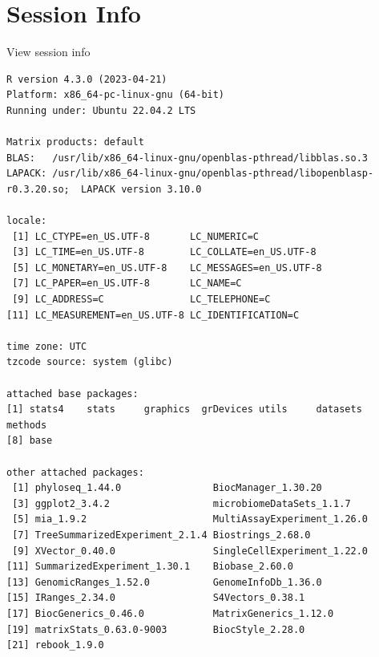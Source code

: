 \documentclass[
]{book}
\begin{document}
\hypertarget{session-info-1}{%
\section*{Session Info}\label{session-info-1}}

View session info

\begin{verbatim}
R version 4.3.0 (2023-04-21)
Platform: x86_64-pc-linux-gnu (64-bit)
Running under: Ubuntu 22.04.2 LTS

Matrix products: default
BLAS:   /usr/lib/x86_64-linux-gnu/openblas-pthread/libblas.so.3 
LAPACK: /usr/lib/x86_64-linux-gnu/openblas-pthread/libopenblasp-r0.3.20.so;  LAPACK version 3.10.0

locale:
 [1] LC_CTYPE=en_US.UTF-8       LC_NUMERIC=C              
 [3] LC_TIME=en_US.UTF-8        LC_COLLATE=en_US.UTF-8    
 [5] LC_MONETARY=en_US.UTF-8    LC_MESSAGES=en_US.UTF-8   
 [7] LC_PAPER=en_US.UTF-8       LC_NAME=C                 
 [9] LC_ADDRESS=C               LC_TELEPHONE=C            
[11] LC_MEASUREMENT=en_US.UTF-8 LC_IDENTIFICATION=C       

time zone: UTC
tzcode source: system (glibc)

attached base packages:
[1] stats4    stats     graphics  grDevices utils     datasets  methods  
[8] base     

other attached packages:
 [1] phyloseq_1.44.0                BiocManager_1.30.20           
 [3] ggplot2_3.4.2                  microbiomeDataSets_1.1.7      
 [5] mia_1.9.2                      MultiAssayExperiment_1.26.0   
 [7] TreeSummarizedExperiment_2.1.4 Biostrings_2.68.0             
 [9] XVector_0.40.0                 SingleCellExperiment_1.22.0   
[11] SummarizedExperiment_1.30.1    Biobase_2.60.0                
[13] GenomicRanges_1.52.0           GenomeInfoDb_1.36.0           
[15] IRanges_2.34.0                 S4Vectors_0.38.1              
[17] BiocGenerics_0.46.0            MatrixGenerics_1.12.0         
[19] matrixStats_0.63.0-9003        BiocStyle_2.28.0              
[21] rebook_1.9.0                  


\end{verbatim}
\end{document}
